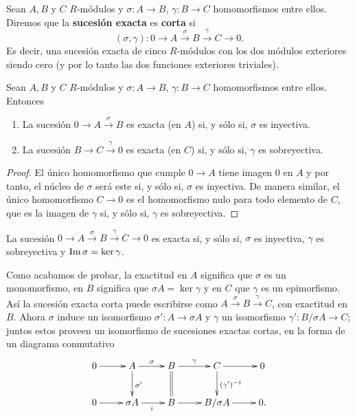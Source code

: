 \begin{definicion}
	Sean $A,B$ y $C$ $R$-módulos y $\sigma: A \rightarrow B$,
	$\gamma: B \rightarrow C$ homomorfismos entre ellos. Diremos que la \textbf{sucesión
		exacta} es \textbf{corta} si
	\[
	(\sigma, \gamma): 0 \rightarrow A \xrightarrow{\sigma}B \xrightarrow{\gamma}C
	\rightarrow 0.
	\]
	Es decir, una sucesión exacta de cinco $R$-módulos con los dos módulos
	exteriores siendo cero (y por lo tanto las dos funciones exteriores triviales).
\end{definicion}

\begin{proposicion}
	Sean $A,B$ y $C$ $R$-módulos y $\sigma: A \rightarrow B$,
	$\gamma: B \rightarrow C$ homomorfismos entre ellos. Entonces
	\begin{enumerate}
		\item La sucesión $0 \to A \overset{\sigma}{\to}B$ es exacta (en $A$) si, y
		sólo si, $\sigma$ es inyectiva.
		
		\item La sucesión $B \to C \overset{\gamma}{\to}0$ es exacta (en $C$) si, y
		sólo si, $\gamma$ es sobreyectiva.
	\end{enumerate}
\end{proposicion}
\begin{proof}
	El único homomorfismo que cumple $0 \to A$ tiene imagen $0$ en $A$ y por tanto,
	el núcleo de $\sigma$ será este si, y sólo si, $\sigma$ es inyectiva. De manera
	similar, el único homomorfismo $C \to 0$ es el homomorfismo nulo para todo
	elemento de $C$, que es la imagen de $\gamma$ si, y sólo si, $\gamma$ es sobreyectiva.
\end{proof}
\begin{corolario}
	La sucesión $0 \rightarrow A \xrightarrow{\sigma}B \xrightarrow{\gamma}C \rightarrow
	0$ es exacta si, y sólo si, $\sigma$ es inyectiva, $\gamma$ es sobreyectiva y
	$\operatorname{Im} \sigma = \ker \gamma$.
\end{corolario}

Como acabamos de probar, la exactitud en $A$ significa que $\sigma$ es un
monomorfismo, en $B$ significa que $\sigma A = \ker \gamma$ y en $C$ que $\gamma$
es un epimorfismo. Así la sucesión exacta corta puede escribirse como
$A \xrightarrow{\sigma}B \xrightarrow{\gamma}C$, con exactitud en $B$. Ahora
$\sigma$ induce un isomorfismo $\sigma': A \to \sigma A$ y $\gamma$ un
isomorfismo $\gamma': B/\sigma A \to C$; juntos estos proveen un isomorfismo de sucesiones
exactas cortas, en la forma de un diagrama conmutativo
\begin{equation}
	\label{exactshortseq-equiv}\xymatrix{ 0 \ar[r] & A \ar[r]^{\sigma} \ar[d]^{\sigma'} & B \ar[r]^\gamma \ar@{=}[d] & C \ar[r] \ar[d]^{(\gamma')^{-1}} & 0 \\ 0 \ar[r] & \sigma A \ar[r]_i & B \ar[r] & B/\sigma A \ar[r] & 0. }
\end{equation}

